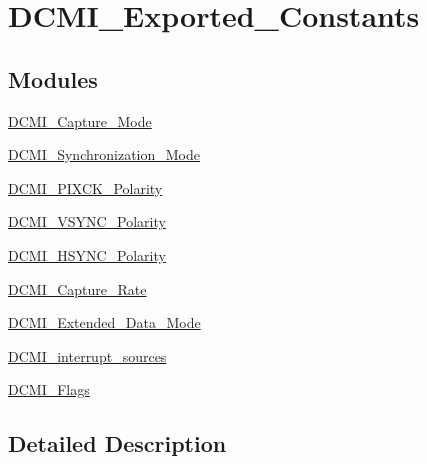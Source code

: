 \hypertarget{group___d_c_m_i___exported___constants}{}\section{D\+C\+M\+I\+\_\+\+Exported\+\_\+\+Constants}
\label{group___d_c_m_i___exported___constants}
\subsection*{Modules}
\begin{DoxyCompactItemize}
\item 
\hyperlink{group___d_c_m_i___capture___mode}{D\+C\+M\+I\+\_\+\+Capture\+\_\+\+Mode}
\item 
\hyperlink{group___d_c_m_i___synchronization___mode}{D\+C\+M\+I\+\_\+\+Synchronization\+\_\+\+Mode}
\item 
\hyperlink{group___d_c_m_i___p_i_x_c_k___polarity}{D\+C\+M\+I\+\_\+\+P\+I\+X\+C\+K\+\_\+\+Polarity}
\item 
\hyperlink{group___d_c_m_i___v_s_y_n_c___polarity}{D\+C\+M\+I\+\_\+\+V\+S\+Y\+N\+C\+\_\+\+Polarity}
\item 
\hyperlink{group___d_c_m_i___h_s_y_n_c___polarity}{D\+C\+M\+I\+\_\+\+H\+S\+Y\+N\+C\+\_\+\+Polarity}
\item 
\hyperlink{group___d_c_m_i___capture___rate}{D\+C\+M\+I\+\_\+\+Capture\+\_\+\+Rate}
\item 
\hyperlink{group___d_c_m_i___extended___data___mode}{D\+C\+M\+I\+\_\+\+Extended\+\_\+\+Data\+\_\+\+Mode}
\item 
\hyperlink{group___d_c_m_i__interrupt__sources}{D\+C\+M\+I\+\_\+interrupt\+\_\+sources}
\item 
\hyperlink{group___d_c_m_i___flags}{D\+C\+M\+I\+\_\+\+Flags}
\end{DoxyCompactItemize}


\subsection{Detailed Description}
